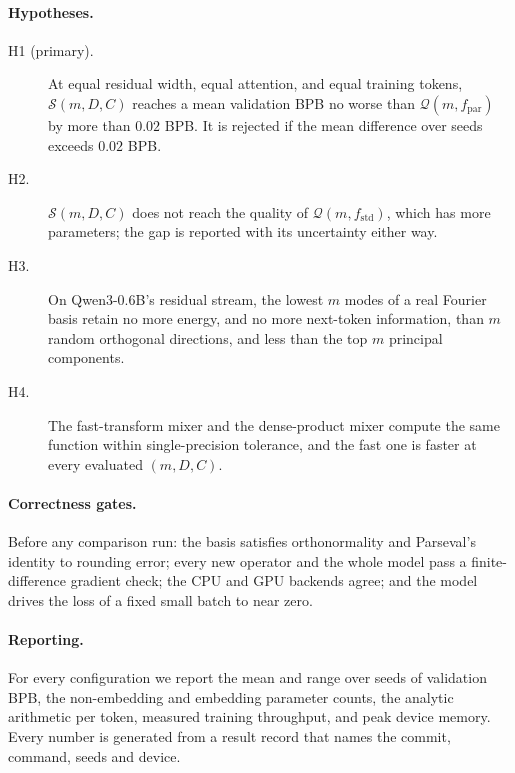 \paragraph{Hypotheses.}
\begin{description}
\item[H1 (primary).] At equal residual width, equal attention, and equal
  training tokens, $\mathcal{S}(m,D,C)$ reaches a mean validation BPB no
  worse than $\mathcal{Q}(m,f_{\mathrm{par}})$ by more than $0.02$ BPB. It is
  rejected if the mean difference over seeds exceeds $0.02$ BPB.
\item[H2.] $\mathcal{S}(m,D,C)$ does not reach the quality of
  $\mathcal{Q}(m,f_{\mathrm{std}})$, which has more parameters; the gap is
  reported with its uncertainty either way.
\item[H3.] On Qwen3-0.6B's residual stream, the lowest $m$ modes of a real
  Fourier basis retain no more energy, and no more next-token information, than
  $m$ random orthogonal directions, and less than the top $m$ principal
  components.
\item[H4.] The fast-transform mixer and the dense-product mixer compute the
  same function within single-precision tolerance, and the fast one is faster
  at every evaluated $(m,D,C)$.
\end{description}

\paragraph{Correctness gates.} Before any comparison run: the basis
satisfies orthonormality and Parseval's identity to rounding error; every new
operator and the whole model pass a finite-difference gradient check; the CPU
and GPU backends agree; and the model drives the loss of a fixed small batch
to near zero.

\paragraph{Reporting.} For every configuration we report the mean and range
over seeds of validation BPB, the non-embedding and embedding parameter
counts, the analytic arithmetic per token, measured training throughput, and
peak device memory. Every number is generated from a result record that names
the commit, command, seeds and device.
